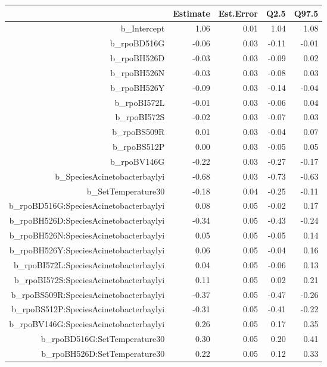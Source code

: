 \begin{table}[ht]
\centering
\begin{tabular}{rrrrr}
  \hline
 & Estimate & Est.Error & Q2.5 & Q97.5 \\ 
  \hline
b\_Intercept & 1.06 & 0.01 & 1.04 & 1.08 \\ 
  b\_rpoBD516G & -0.06 & 0.03 & -0.11 & -0.01 \\ 
  b\_rpoBH526D & -0.03 & 0.03 & -0.09 & 0.02 \\ 
  b\_rpoBH526N & -0.03 & 0.03 & -0.08 & 0.03 \\ 
  b\_rpoBH526Y & -0.09 & 0.03 & -0.14 & -0.04 \\ 
  b\_rpoBI572L & -0.01 & 0.03 & -0.06 & 0.04 \\ 
  b\_rpoBI572S & -0.02 & 0.03 & -0.07 & 0.03 \\ 
  b\_rpoBS509R & 0.01 & 0.03 & -0.04 & 0.07 \\ 
  b\_rpoBS512P & 0.00 & 0.03 & -0.05 & 0.05 \\ 
  b\_rpoBV146G & -0.22 & 0.03 & -0.27 & -0.17 \\ 
  b\_SpeciesAcinetobacterbaylyi & -0.68 & 0.03 & -0.73 & -0.63 \\ 
  b\_SetTemperature30 & -0.18 & 0.04 & -0.25 & -0.11 \\ 
  b\_rpoBD516G:SpeciesAcinetobacterbaylyi & 0.08 & 0.05 & -0.02 & 0.17 \\ 
  b\_rpoBH526D:SpeciesAcinetobacterbaylyi & -0.34 & 0.05 & -0.43 & -0.24 \\ 
  b\_rpoBH526N:SpeciesAcinetobacterbaylyi & 0.05 & 0.05 & -0.05 & 0.14 \\ 
  b\_rpoBH526Y:SpeciesAcinetobacterbaylyi & 0.06 & 0.05 & -0.04 & 0.16 \\ 
  b\_rpoBI572L:SpeciesAcinetobacterbaylyi & 0.04 & 0.05 & -0.06 & 0.13 \\ 
  b\_rpoBI572S:SpeciesAcinetobacterbaylyi & 0.11 & 0.05 & 0.02 & 0.21 \\ 
  b\_rpoBS509R:SpeciesAcinetobacterbaylyi & -0.37 & 0.05 & -0.47 & -0.26 \\ 
  b\_rpoBS512P:SpeciesAcinetobacterbaylyi & -0.31 & 0.05 & -0.41 & -0.22 \\ 
  b\_rpoBV146G:SpeciesAcinetobacterbaylyi & 0.26 & 0.05 & 0.17 & 0.35 \\ 
  b\_rpoBD516G:SetTemperature30 & 0.30 & 0.05 & 0.20 & 0.41 \\ 
  b\_rpoBH526D:SetTemperature30 & 0.22 & 0.05 & 0.12 & 0.33 \\ 

\end{tabular}
\end{table}
